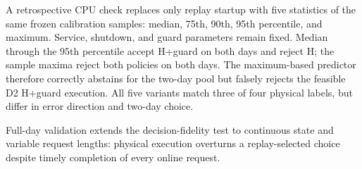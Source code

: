 A retrospective CPU check replaces only replay startup with five statistics
of the same frozen calibration samples: median, 75th, 90th, 95th percentile,
and maximum. Service, shutdown, and guard parameters remain fixed. Median
through the 95th percentile accept H+guard on both days and reject H;
the sample maxima reject both policies on both days. The maximum-based
predictor therefore correctly abstains for the two-day pool but falsely
rejects the feasible D2 H+guard execution.
All five variants match three of four physical labels, but differ in error
direction and two-day choice.

Full-day validation extends the decision-fidelity test to continuous state
and variable request lengths: physical execution overturns a replay-selected
choice despite timely completion of every online request.




